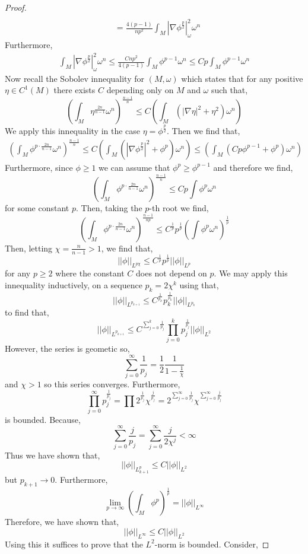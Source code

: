 \documentclass[12pt]{extarticle}
\theoremstyle{definition}
\begin{document}
\begin{proof}
\begin{align*}
\\
& = \frac{4 (p - 1)}{n p^2} \int_M |\nabla \phi^{\frac{p}{2}} |^2_{\omega} \omega^n 
\end{align*}
Furthermore,
\begin{align*}
\int_M |\nabla \phi^{\frac{p}{2}} |^2_\omega \omega^n \le \frac{C n p^2}{4 (p - 1)} \int_M \phi^{p-1} \omega^n \le C p \int_M \phi^{p-1} \omega^{n} 
\end{align*}
Now recall the Sobolev innequality for $(M, \omega)$ which states that for any positive $\eta \in C^1(M)$ there exists $C$ depending only on $M$ and $\omega$ such that,
\[ \left( \int_M \eta^{\frac{2n}{n-1}} \omega^n \right)^{\frac{n-1}{n}} \le C \left( \int_M \left( |\nabla \eta|^2 + \eta^2 \right) \omega^n \right) \]
We apply this innequality in the case $\eta = \phi^{\frac{p}{2}}$. Then we find that,
\begin{align*}
\left( \int_M \phi^{p \cdot \frac{2n}{n-1}} \omega^n \right)^{\frac{n-1}{n}} \le C \left( \int_M \left( | \nabla \phi^{\frac{p}{2}} |^2 + \phi^p \right) \omega^n \right) \le \left( \int_M \left( C p \phi^{p - 1} + \phi^p \right) \omega^n \right)
\end{align*}
Furthermore, since $\phi \ge 1$ we can assume that $\phi^p \ge \phi^{p-1}$ and therefore we find,
\[ \left( \int_M \phi^{p \cdot \frac{2n}{n-1}} \omega^n \right)^{\frac{n-1}{n}} \le C p \int \phi^p \omega^n \]
for some constant $p$. Then, taking the $p$-th root we find,
\[ \left( \int_M \phi^{p \cdot \frac{2n}{n-1}} \omega^n \right)^{\frac{n-1}{np}} \le C^{\frac{1}{p}} p^{\frac{1}{p}} \left( \int \phi^p \omega^n \right)^{\frac{1}{p}} \]
Then, letting $\chi = \frac{n}{n - 1} > 1$, we find that,
\[ || \phi ||_{L^{p \chi}} \le C^{\frac{1}{p}} p^{\frac{1}{p}} || \phi ||_{L^p} \]
for any $p \ge 2$ where the constant $C$ does not depend on $p$. We may apply this innequality inductively, on a sequence $p_k = 2 \chi^k$ using that,
\[ || \phi ||_{L^{p_{k + 1}}} \le C^{\frac{1}{p_k}} p_k^{\frac{1}{p_k}} || \phi ||_{L^{p_k}} \]
to find that,
\[ || \phi ||_{L^{p_{k + 1}}} \le C^{\sum\limits_{j = 0}^k \frac{1}{p_j}} \prod_{j = 0}^k p_j^{\frac{1}{p_j}} || \phi ||_{L^2} \] 
However, the series is geometic so,
\[ \sum_{j = 0}^\infty \frac{1}{p_j} = \frac{1}{2} \frac{1}{1 - \frac{1}{\chi}} \]
and $\chi > 1$ so this series converges. Furthermore,
\[ \prod_{j = 0}^\infty p_j^{\frac{1}{p_j}} = \prod 2^{\frac{1}{p_j}} \chi^{\frac{j}{p_j}} = 2^{\sum\limits_{j = 0}^\infty \frac{1}{p_j}} \chi^{\sum\limits_{j = 0}^{\infty} \frac{j}{p_j}} \]
is bounded. Because,
\[ \sum\limits_{j = 0}^{\infty} \frac{j}{p_j} = \sum\limits_{j = 0}^{\infty} \frac{j}{2 \chi^j} < \infty \] 
Thus we have shown that,
\[ || \phi ||_{L^p_{k + 1}} \le C || \phi ||_{L^2} \]
but $p_{k+1} \to 0$. Furthermore,
\[ \lim_{p \to \infty} \left( \int_M \phi^p \right)^{\frac{1}{p}} = || \phi ||_{L^\infty} \]
Therefore, we have shown that,
\[ || \phi ||_{L^\infty} \le C || \phi ||_{L^2} \]
Using this it suffices to prove that the $L^2$-norm is bounded. Consider,
\end{proof}
\end{document}
